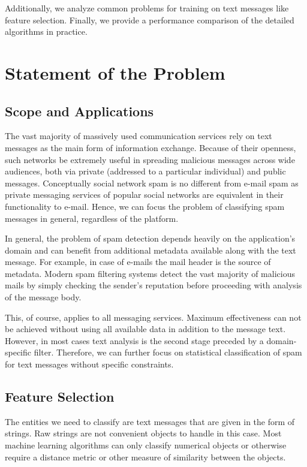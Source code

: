 \documentclass[12pt]{report}
\begin{document}
Additionally, we analyze common problems for training on text messages like feature selection. Finally, we provide a performance comparison of the detailed algorithms in practice.

\newpage


\chapter{Statement of the Problem}

\section{Scope and Applications}

The vast majority of massively used communication services rely on text messages as the main form of information exchange. Because of their openness, such networks be extremely useful in spreading malicious messages across wide audiences, both via private (addressed to a particular individual) and public messages. Conceptually social network spam is no different from e-mail spam as private messaging services of popular social networks are equivalent in their functionality to e-mail. Hence, we can focus the problem of classifying spam messages in general, regardless of the platform.

In general, the problem of spam detection depends heavily on the application's domain and can benefit from additional metadata available along with the text message. For example, in case of e-mails the mail header is the source of metadata. Modern spam filtering systems detect the vast majority of malicious mails by simply checking the sender's reputation before proceeding with analysis of the message body.

This, of course, applies to all messaging services. Maximum effectiveness can not be achieved without using all available data in addition to the message text. However, in most cases text analysis is the second stage preceded by a domain-specific filter. Therefore, we can further focus on statistical classification of spam for text messages without specific constraints.

\newpage

\section{Feature Selection}

The entities we need to classify are text messages that are given in the form of strings. Raw strings are not convenient objects to handle in this case. Most machine learning algorithms can only classify numerical objects or otherwise require a distance metric or other measure of similarity between the objects.
\end{document}
